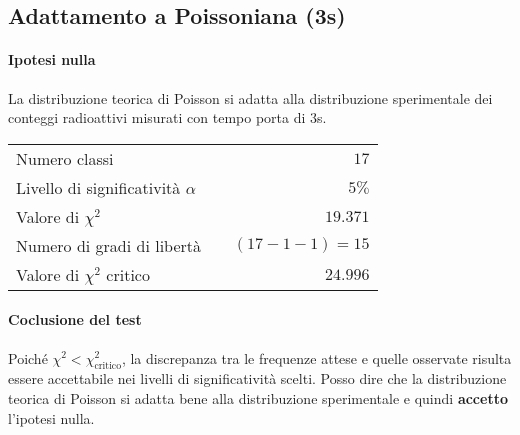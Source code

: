 \documentclass{article}
\begin{document}
\subsection{Adattamento a Poissoniana (3s)}
\paragraph{Ipotesi nulla} La distribuzione teorica di Poisson si adatta alla distribuzione sperimentale dei conteggi radioattivi misurati con tempo porta di 3s.

\vspace{0.2cm}
\begin{center}
\begin{tabular}{lr}
	Numero classi & $17$ \\
	Livello di significatività $\alpha$		& $ \quad 5\%$  \\
	Valore di $\chi ^2$             	& $\quad 19.371$       \\
	Numero di gradi di libertà      	& $\quad (17-1-1) = 15$         \\   
	Valore di $\chi ^2$ critico     	& $\quad 24.996$
\end{tabular}
\end{center}

\paragraph{Coclusione del test} Poiché $\chi^2 < \chi^2_{\text{critico}}$, la discrepanza tra le frequenze attese e quelle osservate risulta essere accettabile nei livelli di significatività scelti. Posso dire che la distribuzione teorica di Poisson si adatta bene alla distribuzione sperimentale e quindi \textbf{accetto} l'ipotesi nulla.
\end{document}
